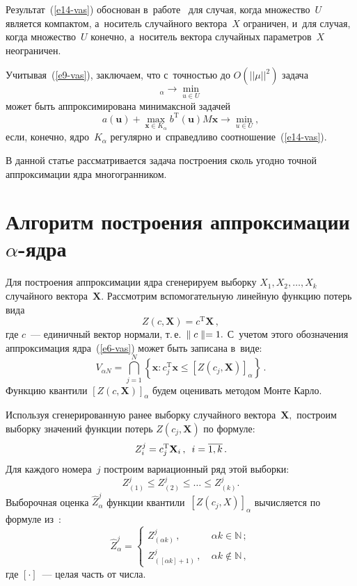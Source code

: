 \begin{multicols}{2}
Результат~(\ref{e14-vas}) обоснован в~работе~\cite{vaskan2} для случая, 
когда множество~$U$ является компактом, а~носитель случайного вектора~$X$ 
ограничен, и~для случая, когда множество~$U$ конечно, а~носитель вектора 
случайных па\-ра\-мет\-ров~$X$ неограничен.

Учитывая~(\ref{e9-vas}), заключаем, что с~точ\-ностью до $O(||\mu||^2)$ задача
\begin{equation*}
[\Phi(\mathbf {X},\mathbf {u})]_\alpha\to \min\limits_{u\in U}
\end{equation*}
может быть аппроксимирована минимаксной задачей
\begin{equation*}
a(\mathbf {u})+\max\limits_{\mathbf {x}\in K_\alpha} b^{\mathrm{T}}
(\mathbf {u}) M \mathbf {x} \to \min\limits_{u\in U},
\end{equation*}
если, конечно, ядро~$K_\alpha$ регулярно и~справедливо соотношение~(\ref{e14-vas}).

В данной статье рассматривается задача построения сколь угодно 
точ\-ной аппроксимации ядра многогранником.

\section{Алгоритм построения аппроксимации $\alpha$-ядра}

Для построения аппроксимации ядра сгенерируем выборку $X_1, X_2, \ldots, X_k$ 
случайного вектора~$\mathbf {X}.$
Рас\-смот\-рим вспомогательную линейную функцию потерь вида
$$
Z(c,\mathbf {X})=c^{\mathrm {T}} \mathbf{X}\,,
$$
где $c$~--- единичный вектор нормали, т.\,е.\ \mbox{$\parallel c\parallel \hm= 1.$}
С~учетом этого обозначения аппроксимация ядра~(\ref{e6-vas}) может быть записана в~виде:
\begin{equation*}
V_{\alpha N}=\bigcap\limits_{j=1}^{N} \left\{ \mathbf {x}: c_j^{\mathrm{T}} 
\mathbf{x} \leqslant  \left [ Z\left(c_j, \mathbf {X} \right) \right]_\alpha\right \}\,.
\end{equation*}
Функцию квантили $[Z(c,\mathbf {X})]_\alpha$ будем оценивать методом Мон\-те Карло.

Используя сгенерированную ранее выборку случайного вектора~$\mathbf {X},$ 
по\-стро\-им выборку значений функ\-ции потерь $Z(c_j,\mathbf{X})$ по формуле:
$$
Z_i^j=c_j^{\mathrm{T}} \mathbf {X}_i\,,\enskip i=\overline{1,k}\,.
$$
Для каждого номера~$j$ построим вариационный ряд этой выборки:
$$
Z_{(1)}^j \leq Z_{(2)}^j\leq \dots \leq Z_{(k)}^j.
$$
Выборочная оценка $\widehat Z^j_\alpha$ функции квантили~$\left[Z(c_j,X)\right]_\alpha$  
вы\-чис\-ля\-ет\-ся по формуле  из~\cite{kankibzun}:
\begin{equation*}
\widehat Z^j_\alpha=
\begin{cases}
Z ^j_{(\alpha k)}\,, &\ \alpha k\in \mathbb{ N}\,;\\
Z ^j_{([\alpha k]+1)}\,, &\ \alpha k\notin \mathbb{ N}\,,
\end{cases}
\end{equation*}
где $[\cdot]$~--- целая часть от числа.


\end{multicols}
